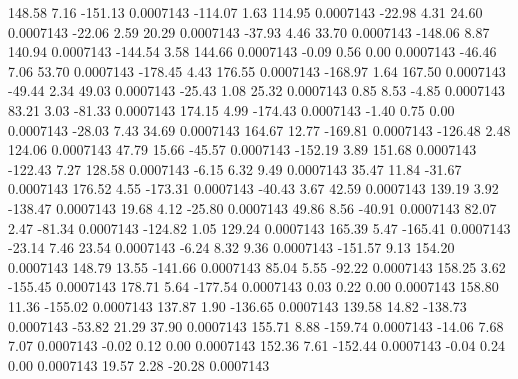       148.58        7.16     -151.13     0.0007143
     -114.07        1.63      114.95     0.0007143
      -22.98        4.31       24.60     0.0007143
      -22.06        2.59       20.29     0.0007143
      -37.93        4.46       33.70     0.0007143
     -148.06        8.87      140.94     0.0007143
     -144.54        3.58      144.66     0.0007143
       -0.09        0.56        0.00     0.0007143
      -46.46        7.06       53.70     0.0007143
     -178.45        4.43      176.55     0.0007143
     -168.97        1.64      167.50     0.0007143
      -49.44        2.34       49.03     0.0007143
      -25.43        1.08       25.32     0.0007143
        0.85        8.53       -4.85     0.0007143
       83.21        3.03      -81.33     0.0007143
      174.15        4.99     -174.43     0.0007143
       -1.40        0.75        0.00     0.0007143
      -28.03        7.43       34.69     0.0007143
      164.67       12.77     -169.81     0.0007143
     -126.48        2.48      124.06     0.0007143
       47.79       15.66      -45.57     0.0007143
     -152.19        3.89      151.68     0.0007143
     -122.43        7.27      128.58     0.0007143
       -6.15        6.32        9.49     0.0007143
       35.47       11.84      -31.67     0.0007143
      176.52        4.55     -173.31     0.0007143
      -40.43        3.67       42.59     0.0007143
      139.19        3.92     -138.47     0.0007143
       19.68        4.12      -25.80     0.0007143
       49.86        8.56      -40.91     0.0007143
       82.07        2.47      -81.34     0.0007143
     -124.82        1.05      129.24     0.0007143
      165.39        5.47     -165.41     0.0007143
      -23.14        7.46       23.54     0.0007143
       -6.24        8.32        9.36     0.0007143
     -151.57        9.13      154.20     0.0007143
      148.79       13.55     -141.66     0.0007143
       85.04        5.55      -92.22     0.0007143
      158.25        3.62     -155.45     0.0007143
      178.71        5.64     -177.54     0.0007143
        0.03        0.22        0.00     0.0007143
      158.80       11.36     -155.02     0.0007143
      137.87        1.90     -136.65     0.0007143
      139.58       14.82     -138.73     0.0007143
      -53.82       21.29       37.90     0.0007143
      155.71        8.88     -159.74     0.0007143
      -14.06        7.68        7.07     0.0007143
       -0.02        0.12        0.00     0.0007143
      152.36        7.61     -152.44     0.0007143
       -0.04        0.24        0.00     0.0007143
       19.57        2.28      -20.28     0.0007143
